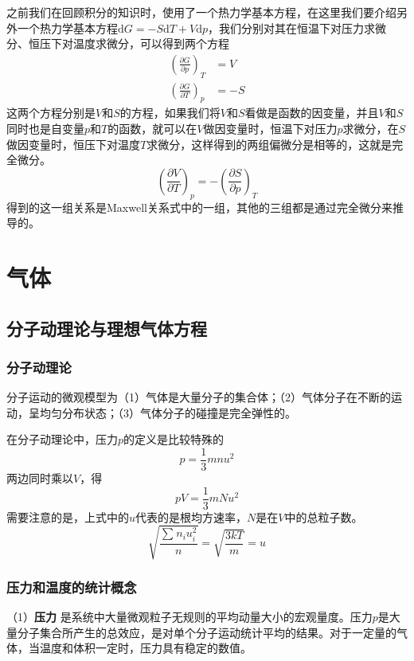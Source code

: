 \documentclass[lang=cn,newtx,10pt,scheme=chinese]{elegantbook}
\begin{document}
之前我们在回顾积分的知识时，使用了一个热力学基本方程，在这里我们要介绍另外一个热力学基本方程$\mathrm{d}G=-S\mathrm{d}T+V\mathrm{d}p$，我们分别对其在恒温下对压力求微分、恒压下对温度求微分，可以得到两个方程
\begin{equation}
	\begin{aligned}
		\left ( \frac{\partial G}{\partial p}  \right )_T &= V 
		\\[1.5ex]
		\left ( \frac{\partial G}{\partial T}  \right )_p &= -S
	\end{aligned}
\end{equation}
这两个方程分别是$V$和$S$的方程，如果我们将$V$和$S$看做是函数的因变量，并且$V$和$S$同时也是自变量$p$和$T$的函数，就可以在$V$做因变量时，恒温下对压力$p$求微分，在$S$做因变量时，恒压下对温度$T$求微分，这样得到的两组偏微分是相等的，这就是完全微分。
\begin{equation}
	\left ( \frac{\partial V}{\partial T}  \right )_p = -\left ( \frac{\partial S}{\partial p}  \right )_T
\end{equation}
得到的这一组关系是Maxwell关系式中的一组，其他的三组都是通过完全微分来推导的。

\chapter{气体}
\section{分子动理论与理想气体方程}
\subsection{分子动理论}
分子运动的微观模型为（1）气体是大量分子的集合体；（2）气体分子在不断的运动，呈均匀分布状态；（3）气体分子的碰撞是完全弹性的。

在分子动理论中，压力$p$的定义是比较特殊的
\begin{equation}
	p=\frac{1}{3}mnu^2
\end{equation}
两边同时乘以$V$，得
\begin{equation}
	pV=\frac{1}{3}mNu^2
\end{equation}
需要注意的是，上式中的$u$代表的是根均方速率，$N$是在$V$中的总粒子数。
\begin{equation}
	\sqrt{\displaystyle \frac{\sum_{}^{} n_iu_i^2}{n} } =\sqrt{\frac{3kT}{m}}=u
\end{equation}
\subsection{压力和温度的统计概念}
（1）\textbf{压力} \quad 是系统中大量微观粒子无规则的平均动量大小的宏观量度。压力$p$是大量分子集合所产生的总效应，是对单个分子运动统计平均的结果。对于一定量的气体，当温度和体积一定时，压力具有稳定的数值。
\end{document}
